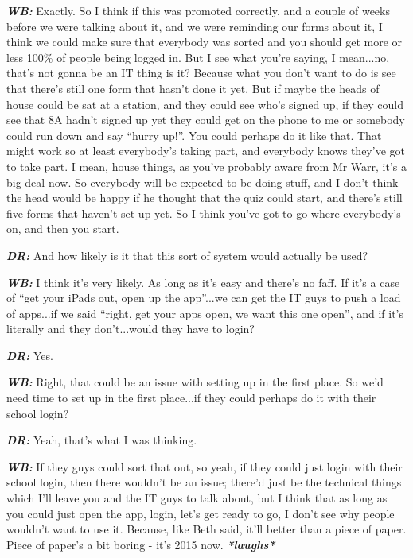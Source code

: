 \textit{\textbf{WB:}} Exactly. So I think if this was promoted correctly, and a couple of weeks before we were talking about it, and we were reminding our forms about it, I think we could make sure that everybody was sorted and you should get more or less 100\% of people being logged in. But I see what you're saying, I mean...no, that's not gonna be an IT thing is it? Because what you don't want to do is see that there's still one form that hasn't done it yet. But if maybe the heads of house could be sat at a station, and they could see who's signed up, if they could see that 8A hadn't signed up yet they could get on the phone to me or somebody could run down and say ``hurry up!''. You could perhaps do it like that. That might work so at least everybody's taking part, and everybody knows they've got to take part. I mean, house things, as you've probably aware from Mr Warr, it's a big deal now. So everybody will be expected to be doing stuff, and I don't think the head would be happy if he thought that the quiz could start, and there's still five forms that haven't set up yet. So I think you've got to go where everybody's on, and then you start.

\textit{\textbf{DR:}} And how likely is it that this sort of system would actually be used?

\textit{\textbf{WB:}} I think it's very likely. As long as it's easy and there's no faff. If it's a case of ``get your iPads out, open up the app''...we can get the IT guys to push a load of apps...if we said ``right, get your apps open, we want this one open'', and if it's literally and they don't...would they have to login?

\textit{\textbf{DR:}} Yes.

\textit{\textbf{WB:}} Right, that could be an issue with setting up in the first place. So we'd need time to set up in the first place...if they could perhaps do it with their school login?

\textit{\textbf{DR:}} Yeah, that's what I was thinking.

\textit{\textbf{WB:}} If they guys could sort that out, so yeah, if they could just login with their school login, then there wouldn't be an issue; there'd just be the technical things which I'll leave you and the IT guys to talk about, but I think that as long as you could just open the app, login, let's get ready to go, I don't see why people wouldn't want to use it. Because, like Beth said, it'll better than a piece of paper. Piece of paper's a bit boring - it's 2015 now. \textit{\textbf{*laughs*}} 

